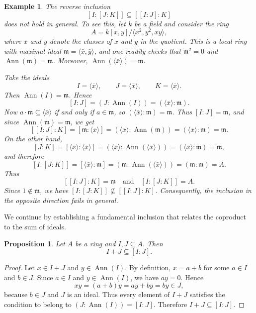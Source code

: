 \documentclass{amsart}
\newtheorem{proposition}{Proposition}
\newtheorem{example}{Example}
\DeclareMathOperator{\ann}{Ann}
\begin{document}
\begin{example}\label{ex:nonassoc}
The reverse inclusion
\[
[I:[J:K]] \subseteq [[I:J]:K]
\]
does not hold in general. To see this, let $k$ be a field and consider the ring
\[
A = k[x,y]/\langle x^2, y^2, xy\rangle,
\]
where $\bar{x}$ and $\bar{y}$ denote the classes of $x$ and $y$ in the quotient. This is a local ring with maximal ideal $\mathfrak{m}=\langle \bar{x}, \bar{y} \rangle$, and one readily checks that $\mathfrak{m}^2=0$ and $\ann(\mathfrak{m})=\mathfrak{m}$. Moreover, $\ann(\langle \bar{x} \rangle)=\mathfrak{m}$.

Take the ideals
\[
I=\langle \bar{x} \rangle,\qquad J=\langle \bar{x} \rangle,\qquad K=\langle \bar{x} \rangle.
\]
Then $\ann(I)=\mathfrak{m}$. Hence
\[
[I:J]=(J:\ann(I))=(\langle \bar{x} \rangle:\mathfrak{m}).
\]
Now $a\cdot \mathfrak{m}\subseteq \langle \bar{x} \rangle$ if and only if $a\in \mathfrak{m}$, so $(\langle \bar{x} \rangle:\mathfrak{m})=\mathfrak{m}$. Thus $[I:J]=\mathfrak{m}$, and since $\ann(\mathfrak{m})=\mathfrak{m}$, we get
\[
[[I:J]:K]=[\mathfrak{m}:\langle \bar{x} \rangle]=(\langle \bar{x} \rangle:\ann(\mathfrak{m}))=(\langle \bar{x} \rangle:\mathfrak{m})=\mathfrak{m}.
\]
On the other hand,
\[
[J:K]=[\langle \bar{x} \rangle:\langle \bar{x} \rangle]=(\langle \bar{x} \rangle:\ann(\langle \bar{x} \rangle))=(\langle \bar{x} \rangle:\mathfrak{m})=\mathfrak{m},
\]
and therefore
\[
[I:[J:K]]=[\langle \bar{x} \rangle:\mathfrak{m}]=(\mathfrak{m}:\ann(\langle \bar{x} \rangle))=(\mathfrak{m}:\mathfrak{m})=A.
\]
Thus
\[
[[I:J]:K]=\mathfrak{m} \quad\text{and}\quad [I:[J:K]]=A.
\]
Since $1\notin \mathfrak{m}$, we have $[I:[J:K]]\nsubseteq [[I:J]:K]$. Consequently, the inclusion in the opposite direction fails in general.
\end{example}

We continue by establishing a fundamental inclusion that relates the coproduct to the sum of ideals.

\begin{proposition}\label{pro:sum}
Let $A$ be a ring and $I,J\subseteq A$. Then
\[
I+J \subseteq [I:J].
\]
\end{proposition}

\begin{proof}
Let $x\in I+J$ and $y\in \ann(I)$. By definition, $x=a+b$ for some $a\in I$ and $b\in J$. Since $a\in I$ and $y\in \ann(I)$, we have $ay=0$. Hence
\[
xy=(a+b)y=ay+by=by\in J,
\]
because $b\in J$ and $J$ is an ideal. Thus every element of $I+J$ satisfies the condition to belong to $(J:\ann(I))=[I:J]$. Therefore $I+J\subseteq [I:J]$.
\end{proof}
\end{document}

